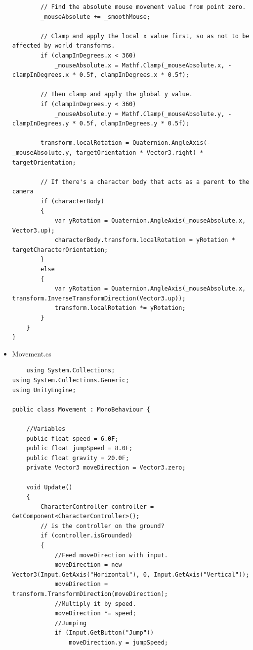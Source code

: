 \documentclass[12pt,a4paper]{article}
\begin{document}
\begin{itemize}
\begin{verbatim}
        // Find the absolute mouse movement value from point zero.
        _mouseAbsolute += _smoothMouse;

        // Clamp and apply the local x value first, so as not to be affected by world transforms.
        if (clampInDegrees.x < 360)
            _mouseAbsolute.x = Mathf.Clamp(_mouseAbsolute.x, -clampInDegrees.x * 0.5f, clampInDegrees.x * 0.5f);

        // Then clamp and apply the global y value.
        if (clampInDegrees.y < 360)
            _mouseAbsolute.y = Mathf.Clamp(_mouseAbsolute.y, -clampInDegrees.y * 0.5f, clampInDegrees.y * 0.5f);

        transform.localRotation = Quaternion.AngleAxis(-_mouseAbsolute.y, targetOrientation * Vector3.right) * targetOrientation;

        // If there's a character body that acts as a parent to the camera
        if (characterBody)
        {
            var yRotation = Quaternion.AngleAxis(_mouseAbsolute.x, Vector3.up);
            characterBody.transform.localRotation = yRotation * targetCharacterOrientation;
        }
        else
        {
            var yRotation = Quaternion.AngleAxis(_mouseAbsolute.x, transform.InverseTransformDirection(Vector3.up));
            transform.localRotation *= yRotation;
        }
    }
}

	\end{verbatim}
	\item Movement.cs
	\begin{verbatim}
	using System.Collections;
using System.Collections.Generic;
using UnityEngine;

public class Movement : MonoBehaviour {

    //Variables
    public float speed = 6.0F;
    public float jumpSpeed = 8.0F;
    public float gravity = 20.0F;
    private Vector3 moveDirection = Vector3.zero;

    void Update()
    {
        CharacterController controller = GetComponent<CharacterController>();
        // is the controller on the ground?
        if (controller.isGrounded)
        {
            //Feed moveDirection with input.
            moveDirection = new Vector3(Input.GetAxis("Horizontal"), 0, Input.GetAxis("Vertical"));
            moveDirection = transform.TransformDirection(moveDirection);
            //Multiply it by speed.
            moveDirection *= speed;
            //Jumping
            if (Input.GetButton("Jump"))
                moveDirection.y = jumpSpeed;


\end{verbatim}
\end{itemize}
\end{document}
